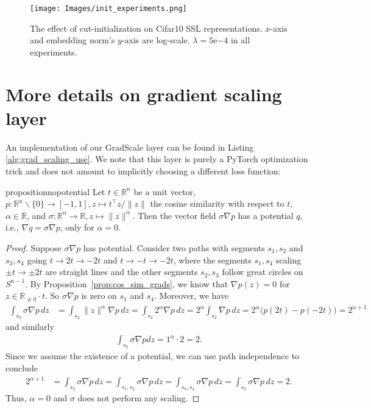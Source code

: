 \begin{figure}[t!]
    \centering
    \texttt{[image: Images/init\_experiments.png]}
    \caption{The effect of cut-initialization on Cifar10 SSL representations. $x$-axis and embedding norm's $y$-axis are log-scale. $\lambda=5$e$-4$ in all experiments.}
    \label{fig:cut_experiments}
\end{figure}

\section{More details on gradient scaling layer}
\label{app:grad_scaling}

An implementation of our GradScale layer can be found in Listing \ref{alg:grad_scaling_use}.
We note that this layer is purely a PyTorch optimization trick and does not amount to implicitly choosing a different loss function:

\begin{restatable}{proposition}{nopotential}
    \label{prop:no_potential}
    Let $t\in\mathbb{R}^n$ be a unit vector, $p: \mathbb{R}^n\backslash \{0\} \to [-1, 1], z\mapsto t^\top z/\|z\|$ the cosine similarity with respect to $t$, $\alpha \in \mathbb{R}$, and $\sigma: \mathbb{R}^n \to  \mathbb{R}, z\mapsto \|z\|^\alpha$. Then the vector field $\sigma\nabla p$ has a potential $q$, i.e., $\nabla q = \sigma \nabla p$, only for $\alpha=0$.
\end{restatable}

\begin{proof}
    Suppose $\sigma \nabla p$ has potential. Consider two paths with segments $s_1, s_2$ and $s_3, s_4$ going $t \to 2t \to -2t$ and $t \to -t \to -2t$, where the segments $s_1, s_4$ scaling $\pm t \to \pm2t$ are straight lines and the other segments $s_2, s_3$ follow great circles on $S^{n-1}$. By Proposition~\ref{prop:cos_sim_grads}, we know that $\nabla p(z)=0$ for $z\in \mathbb{R}_{\neq 0}\cdot t$. So $\sigma \nabla p$ is zero on $s_1$ and $s_4$. Moreover, we have
    \begin{align}
        \int_{s_2} \sigma \nabla p \,dz &= \int_{s_2} \|z\|^\alpha \nabla p \,dz
        = \int_{s_2} 2^\alpha \nabla p \,dz 
        = 2^\alpha \int_{s_2} \nabla p \,dz 
        = 2^\alpha \big(p(2t) - p(-2t)\big) = 2^{\alpha+1}
    \end{align}
    and similarly 
    \begin{align}
        \int_{s_3} \sigma \nabla p dz = 1^\alpha \cdot 2 = 2.
    \end{align}
    Since we assume the existence of a potential, we can use path independence to conclude 
    \begin{align}
        2^{\alpha+1} &= \int_{s_2} \sigma \nabla p \,dz 
        = \int_{s_1, s_2} \sigma \nabla p \,dz 
        = \int_{s_3, s_4} \sigma \nabla p \,dz 
        = \int_{s_3} \sigma \nabla p \,dz 
        = 2.
    \end{align}
    Thus, $\alpha=0$ and $\sigma$ does not perform any scaling.
\end{proof}




